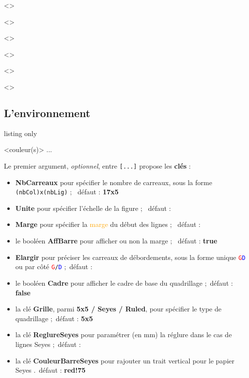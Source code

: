 \documentclass[a4paper]{article}
\newcommand\Cle[1]{{\bfseries\sffamily\textlangle #1\textrangle}}
\begin{document}
\AffQuadrillage[Grille=Milli,NbCarreaux=9x2]<\CoulMilli>\par
\AffQuadrillage[Grille=Milli,NbCarreaux=9x2]<\CoulMilliGris>\par
\AffQuadrillage[Grille=Milli,NbCarreaux=9x2]<\CoulMilliBleu>\par
\AffQuadrillage[Grille=Milli,NbCarreaux=9x2]<\CoulMilliVert>\par
\AffQuadrillage[Grille=Milli,NbCarreaux=9x2]<\CoulMilliChaud>\par
\AffQuadrillage[Grille=Milli,NbCarreaux=9x2]<\CoulMilliContraste>

\pagebreak

\subsection{L'environnement}

\begin{PresentationCode}{listing only}

\begin{EnvQuadrillage}[clés]<couleur(s)>
	...
\end{EnvQuadrillage}
\end{PresentationCode}

Le premier argument, \textit{optionnel}, entre \texttt{[...]} propose les \Cle{clés} :

\begin{itemize}
	\item \Cle{NbCarreaux} pour spécifier le nombre de carreaux, sous la forme \texttt{(nbCol)x(nbLig)} ; \hfill~défaut : \Cle{17x5}
	\item \Cle{Unite} pour spécifier l'échelle de la figure ; \hfill~défaut : \Cle{1}
	\item \Cle{Marge} pour spécifier la \textcolor{orange}{marge} du début des lignes ; \hfill~défaut : \Cle{0}
	\item le booléen \Cle{AffBarre} pour afficher ou non la marge ; \hfill~défaut : \Cle{true}
	\item \Cle{Elargir} pour préciser les carreaux de débordements, sous la forme unique \texttt{\textcolor{red}{G}\textcolor{blue}{D}} ou par côté \texttt{\textcolor{red}{G}/\textcolor{blue}{D}} ;\hfill~défaut : \Cle{0}
	\item le booléen \Cle{Cadre} pour afficher le cadre de base du quadrillage ;\hfill~défaut : \Cle{false}
	\item la clé \Cle{Grille}, parmi \Cle{5x5 / Seyes / Ruled}, pour spécifier le type de quadrillage ;\hfill~défaut : \Cle{5x5}
	\item la clé \Cle{ReglureSeyes} pour paramétrer (en mm) la réglure dans le cas de lignes Seyes ;\hfill~défaut : \Cle{2}
	\item la clé \Cle{CouleurBarreSeyes} pour rajouter un trait vertical pour le papier Seyes .\hfill~défaut : \Cle{red!75}
\end{itemize}
\end{document}

